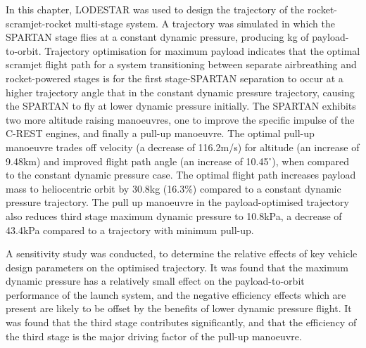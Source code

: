 In this chapter, LODESTAR was used to design the trajectory of the rocket-scramjet-rocket multi-stage system. 
A trajectory was simulated in which the SPARTAN stage flies at a constant dynamic pressure, producing \PayloadToOrbitConstq kg of payload-to-orbit. Trajectory optimisation for maximum payload indicates that the optimal scramjet flight path for a system transitioning between separate airbreathing and rocket-powered stages is for the first stage-SPARTAN separation to occur at a higher trajectory angle that in the constant dynamic pressure trajectory, causing the SPARTAN to fly at lower dynamic pressure initially. The SPARTAN exhibits two more altitude raising manoeuvres, one to improve the specific impulse of the C-REST engines, and finally a pull-up manoeuvre. The optimal pull-up manoeuvre trades off velocity (a decrease of 116.2m/s) for altitude (an increase of 9.48km) and improved flight path angle (an increase of 10.45$^\circ$), when compared to the constant dynamic pressure case. The optimal flight path increases payload mass to heliocentric orbit by 30.8kg (16.3\%) compared to a constant dynamic pressure trajectory. The pull up manoeuvre in the payload-optimised trajectory also reduces third stage maximum dynamic pressure to 10.8kPa, a decrease of 43.4kPa compared to a trajectory with minimum pull-up. 

A sensitivity study was conducted, to determine the relative effects of key vehicle design parameters on the optimised trajectory. It was found that the maximum dynamic pressure has a relatively small effect on the payload-to-orbit performance of the launch system, and the negative efficiency effects which are present are likely to be offset by the benefits of lower dynamic pressure flight. 
It was found that the third stage contributes significantly, and that the efficiency of the third stage is the major driving factor of the pull-up manoeuvre. 

